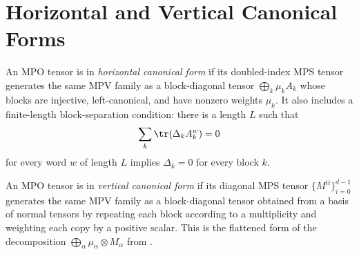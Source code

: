 \section{Horizontal and Vertical Canonical Forms}


\begin{definition}\label{def:horizontal_cf_mpdo}
    \notready
    An MPO tensor is in \emph{horizontal canonical form} if its doubled-index
    MPS tensor generates the same MPV family as a block-diagonal tensor
    $\bigoplus_k \mu_k A_k$ whose blocks are injective, left-canonical, and
    have nonzero weights $\mu_k$. It also includes a finite-length
    block-separation condition: there is a length $L$ such that
    \[
        \sum_k \tr(\Delta_k A_k^w)=0
    \]
    for every word $w$ of length $L$ implies $\Delta_k=0$ for every block $k$.
\end{definition}

\begin{definition}\label{def:vertical_cf_mpdo}
    \notready
    An MPO tensor is in \emph{vertical canonical form} if its diagonal MPS
    tensor $\{M^{ii}\}_{i=0}^{d-1}$ generates the same MPV family as a
    block-diagonal tensor obtained from a basis of normal tensors by repeating
    each block according to a multiplicity and weighting each copy by a
    positive scalar.
    This is the flattened form of the decomposition
    $\bigoplus_\alpha \mu_\alpha \otimes M_\alpha$
    from \cite[Proposition~4.13]{Cirac2016MPDO_arXiv}.
\end{definition}


